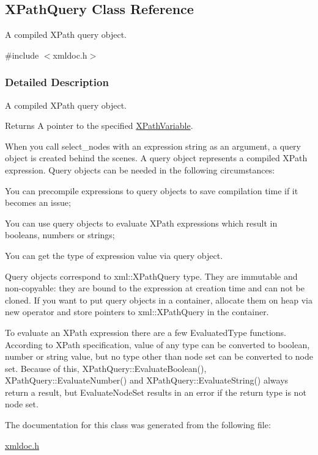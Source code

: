 \hypertarget{classXPathQuery}{
\subsection{XPathQuery Class Reference}
\label{classXPathQuery}
}


A compiled XPath query object.  




{\ttfamily \#include $<$xmldoc.h$>$}



\subsubsection{Detailed Description}
A compiled XPath query object. \begin{DoxyReturn}{Returns}
A pointer to the specified \hyperlink{classXPathVariable}{XPathVariable}.
\end{DoxyReturn}
When you call select\_\-nodes with an expression string as an argument, a query object is created behind the scenes. A query object represents a compiled XPath expression. Query objects can be needed in the following circumstances: \par

\begin{DoxyItemize}
\item You can precompile expressions to query objects to save compilation time if it becomes an issue; \par

\item You can use query objects to evaluate XPath expressions which result in booleans, numbers or strings; \par

\item You can get the type of expression value via query object. \par
 \par
 Query objects correspond to xml::XPathQuery type. They are immutable and non-\/copyable: they are bound to the expression at creation time and can not be cloned. If you want to put query objects in a container, allocate them on heap via new operator and store pointers to xml::XPathQuery in the container. \par
 \par
 To evaluate an XPath expression there are a few EvaluatedType functions. According to XPath specification, value of any type can be converted to boolean, number or string value, but no type other than node set can be converted to node set. Because of this, XPathQuery::EvaluateBoolean(), XPathQuery::EvaluateNumber() and XPathQuery::EvaluateString() always return a result, but EvaluateNodeSet results in an error if the return type is not node set. 
\end{DoxyItemize}

The documentation for this class was generated from the following file:\begin{DoxyCompactItemize}
\item 
\hyperlink{xmldoc_8h}{xmldoc.h}\end{DoxyCompactItemize}
